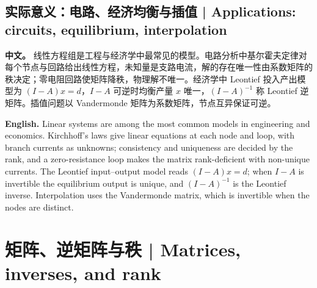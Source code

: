 \documentclass[UTF8,11pt,a4paper]{ctexart}
\newcommand{\APS}[2]{\par\noindent\textbf{中文。} #1\par\noindent\textbf{English.} #2\par\smallskip}
\begin{document}
\subsection{实际意义：电路、经济均衡与插值 | Applications: circuits, equilibrium, interpolation}
\APS{线性方程组是工程与经济学中最常见的模型。电路分析中基尔霍夫定律对每个节点与回路给出线性方程，未知量是支路电流，解的存在唯一性由系数矩阵的秩决定；零电阻回路使矩阵降秩，物理解不唯一。经济学中 Leontief 投入产出模型为 $(I-A)x=d$，$I-A$ 可逆时均衡产量 $x$ 唯一，$(I-A)^{-1}$ 称 Leontief 逆矩阵。插值问题以 Vandermonde 矩阵为系数矩阵，节点互异保证可逆。}{Linear systems are among the most common models in engineering and economics. Kirchhoff's laws give linear equations at each node and loop, with branch currents as unknowns; consistency and uniqueness are decided by the rank, and a zero-resistance loop makes the matrix rank-deficient with non-unique currents. The Leontief input--output model reads $(I-A)x=d$; when $I-A$ is invertible the equilibrium output is unique, and $(I-A)^{-1}$ is the Leontief inverse. Interpolation uses the Vandermonde matrix, which is invertible when the nodes are distinct.}

\section{矩阵、逆矩阵与秩 | Matrices, inverses, and rank}
\end{document}
